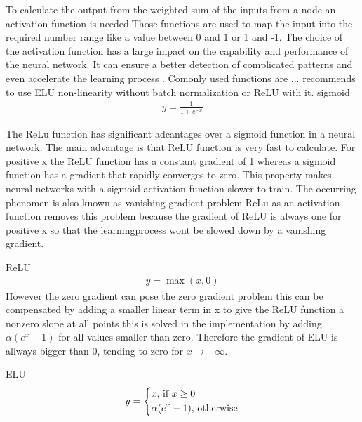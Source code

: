 \documentclass[
a4paper, 
12pt,
grayscalebody, %
abstract=on,
twoside, BCOR10mm, 12pt, DIV13,headinclude, footexclude, final, abstracton, openright
]{ibireprt}
\numberwithin{equation}{chapter}
\numberwithin{table}{chapter}
\numberwithin{figure}{chapter}
\numberwithin{algorithm}{chapter}
\numberwithin{example}{chapter}
\numberwithin{example}{chapter}
\begin{document}
 
To calculate the output from the weighted sum of the inputs from a node an activation function is needed.Those functions are used to map the input into the required number range like a value between 0 and 1 or 1 and -1.  The choice of the activation function has a large impact on the capability and performance of the neural network. It can ensure a better detection of complicated patterns and even accelerate the learning process \cite{Khan2020}. Comonly used functions are ... \cite{Mishkin2017} recommends to use ELU non-linearity without batch normalization or ReLU with it.
sigmoid
\begin{align}
	y = \frac{1}{1+e^{-x}}
\end{align}

The ReLu function has significant adcantages over a sigmoid function in a neural network. The main advantage is that ReLU function is very fast to calculate. For positive x the ReLU function has a constant gradient of 1 whereas a sigmoid function has a gradient that rapidly converges to zero. This property makes neural networks with a sigmoid activation function slower to train. The occurring phenomen is also known as vanishing gradient problem %
ReLu as an activation function removes this problem because the gradient of ReLU is always one for positive x so that the learningprocess wont be slowed down by a vanishing gradient. 

 

ReLU
\begin{align}
	y = \max(x,0)
\end{align}
However the zero gradient can pose the zero gradient problem %
this can be compensated by adding a smaller linear term in x to give the ReLU function a nonzero slope at all points this is solved in the implementation by adding $\alpha(e^x-1)$ for all values smaller than zero. Therefore the gradient of ELU is allways bigger than 0, tending to zero for $x \rightarrow - \infty$.

ELU
\begin{align}
	y = 
	\begin{dcases}
		x \text{, if } x \geq 0 \\
		\alpha(e^x-1) \text{, otherwise}
	\end{dcases}
\end{align}
\end{document}
